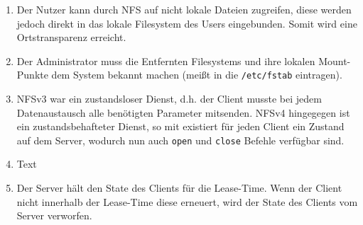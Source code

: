 \documentclass[german,12pt,a4paper]{article}
\begin{document}
\begin{enumerate}

	\item Der Nutzer kann durch NFS auf nicht lokale Dateien zugreifen, diese werden jedoch direkt in
		das lokale Filesystem des Users eingebunden. Somit wird eine Ortstransparenz erreicht.
	
	\item Der Administrator muss die Entfernten Filesystems und ihre lokalen Mount-Punkte dem System
		bekannt machen (meißt in die \texttt{/etc/fstab} eintragen).
	
	\item NFSv3 war ein zustandsloser Dienst, d.h. der Client musste bei jedem Datenaustausch alle
		benötigten Parameter mitsenden. NFSv4 hingegegen ist ein zustandsbehafteter Dienst, so mit
		existiert für jeden Client ein Zustand auf dem Server, wodurch nun auch \texttt{open} und
		\texttt{close} Befehle verfügbar sind.
	
	\item Text
	
	\item Der Server hält den State des Clients für die Lease-Time. Wenn der Client nicht innerhalb
		der Lease-Time diese erneuert, wird der State des Clients vom Server verworfen.

\end{enumerate}
\end{document}
